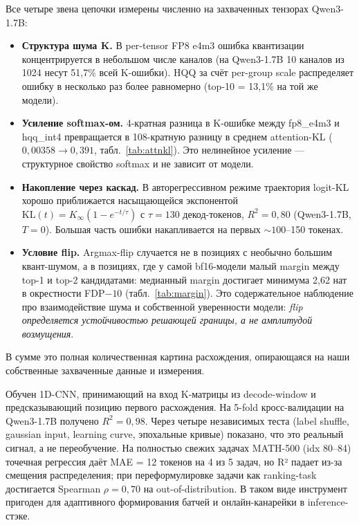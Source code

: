 \documentclass[a4paper,12pt]{article}
\begin{document}
\medskip

\begin{description}[leftmargin=0cm,style=nextline]
\item[\textbf{Ф.1. Количественная mechanistic-цепочка KV-quant
расхождения построена на per-(слой, голова, позиция, канал) уровне
для reasoning-моделей.}]
Все четыре звена цепочки измерены численно на захваченных тензорах
Qwen3-1.7B:
\begin{itemize}[leftmargin=*]
\item \textbf{Структура шума K.} В per-tensor FP8 e4m3 ошибка квантизации
  концентрируется в небольшом числе каналов (на Qwen3-1.7B 10 каналов
  из 1024 несут 51,7\% всей K-ошибки). HQQ за счёт per-group scale
  распределяет ошибку в несколько раз более равномерно (top-10 = 13,1\%
  на той же модели).
\item \textbf{Усиление softmax-ом.} 4-кратная разница в K-ошибке между
  fp8\_e4m3 и hqq\_int4 превращается в 108-кратную разницу в среднем
  attention-KL ($0{,}00358 \to 0{,}391$, табл.~\ref{tab:attnkl}). Это
  нелинейное усиление --- структурное свойство softmax и не зависит от
  модели.
\item \textbf{Накопление через каскад.} В авторегрессивном режиме
  траектория logit-KL хорошо приближается насыщающейся экспонентой
  $\mathrm{KL}(t) = K_\infty(1 - e^{-t/\tau})$ с $\tau = 130$ декод-токенов,
  $R^2 = 0{,}80$ (Qwen3-1.7B, $T=0$). Большая часть ошибки накапливается
  на первых $\sim 100$--150 токенах.
\item \textbf{Условие flip.} Argmax-flip случается не в позициях с
  необычно большим квант-шумом, а в позициях, где у самой bf16-модели
  малый margin между top-1 и top-2 кандидатами: медианный margin
  достигает минимума 2,62 нат в окрестности FDP$-10$ (табл.~\ref{tab:margin}).
  Это содержательное наблюдение про взаимодействие шума и собственной
  уверенности модели: \textit{flip определяется устойчивостью решающей
  границы, а не амплитудой возмущения}.
\end{itemize}
В сумме это полная количественная картина расхождения, опирающаяся на
наши собственные захваченные данные и измерения.

\item[\textbf{Ф.2. ML-предсказатель FDP по K-матрицам.}]
Обучен 1D-CNN, принимающий на вход K-матрицы из decode-window и
предсказывающий позицию первого расхождения. На 5-fold кросс-валидации
на Qwen3-1.7B получено $R^2 = 0{,}98$. Через четыре независимых теста
(label shuffle, gaussian input, learning curve, эпохальные кривые)
показано, что это реальный сигнал, а не переобучение. На полностью
свежих задачах MATH-500 (idx 80--84) точечная регрессия даёт MAE = 12
токенов на 4 из 5 задач, но R² падает из-за смещения распределения; при
переформулировке задачи как ranking-task достигается Spearman
$\rho = 0{,}70$ на out-of-distribution. В таком виде инструмент пригоден
для адаптивного формирования батчей и онлайн-канарейки в
inference-стэке.


\end{description}
\end{document}
